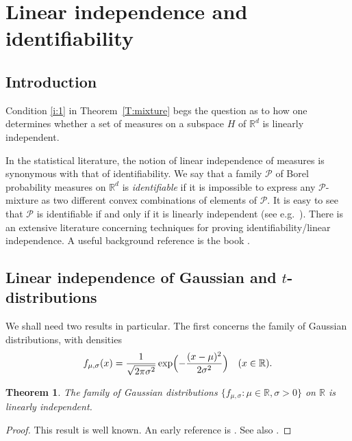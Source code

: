 \documentclass[11pt]{amsart}
\theoremstyle{plain}
\newtheorem{theorem}{Theorem}[section]
\theoremstyle{remark}
\newcommand{\RR}{\mathbb{R}}
\newcommand{\cP}{\mathcal{P}}
\begin{document}
	
\section{Linear independence and identifiability}\label{S:lindep}
		
\subsection{Introduction}

Condition \eqref{i:1} in Theorem~\ref{T:mixture} 
begs the question as to how one determines 
whether a set of measures on a subspace $H$ of $\RR^d$ is linearly independent. 
		
In the statistical literature, the notion of linear independence of measures
is synonymous with that of identifiability.
We say that a family $\cP$ of Borel probability measures on $\RR^d$ is \emph{identifiable}
if it is impossible to express any $\cP$-mixture as two different convex
combinations of elements of $\cP$.
It is easy to see that $\cP$ is identifiable if and only if it
is linearly independent (see e.g.\ \cite[Theorem~3.1.1]{TSM85}).
There is an extensive literature concerning techniques for proving identifiability/linear independence.
A useful background reference is the book \cite{TSM85}.

\subsection{Linear independence of Gaussian and $t$-distributions}
	
We shall need two results in particular. The first concerns the family 
of Gaussian distributions, with densities
\begin{equation}\label{E:Gaussdf}
f_{\mu,\sigma}(x)=\frac{1}{\sqrt{2\pi\sigma^2}}\exp\Bigl(-\frac{(x-\mu)^2}{2\sigma^2}\Bigr) \quad(x\in\RR).
\end{equation}
		
\begin{theorem}\label{T:normalindep}
The family of Gaussian distributions $\{f_{\mu,\sigma}:\mu\in\RR,\sigma>0\}$ on $\RR$ is 
linearly independent.
\end{theorem}
		
\begin{proof}
This result is well known. 
An early reference is  \cite[Proposition~2]{YS68}. See also  \cite[Example 3.1.4]{TSM85}.
\end{proof}
		
\end{document}
